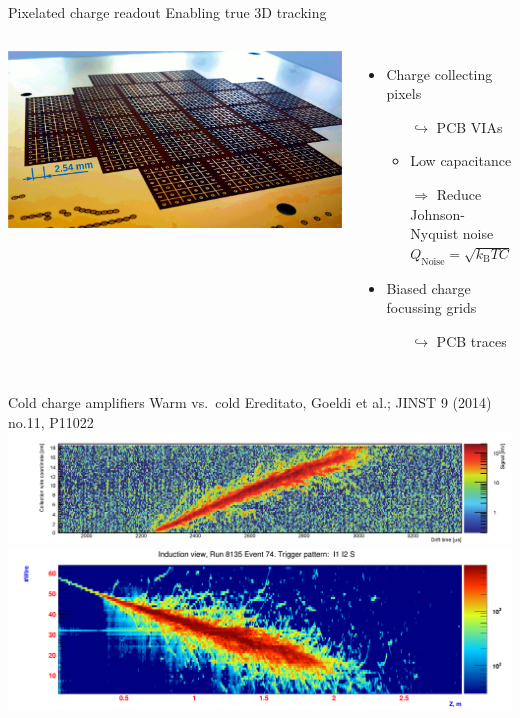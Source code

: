 \documentclass[]{beamer}
\newcommand*{\m}{\mathrm}
\newcommand*{\emphcoltitle}{blue}
\begin{document}
\begin{frame}{Pixelated charge readout}{\color{\emphcoltitle} Enabling true 3D tracking}
	\begin{columns}[c]
		\centering
		\includegraphics[width=\textwidth]{viper/pixies}
		\begin{itemize}
			\item Charge collecting pixels
			\begin{itemize}
				\item[$\hookrightarrow$] PCB VIAs
				\item Low capacitance
				\item[$\Rightarrow$] Reduce Johnson-Nyquist noise $Q_{\m{Noise}} = \sqrt{k_{\m{B}}TC}$
			\end{itemize}
			\item Biased charge focussing grids
			\begin{itemize}
				\item[$\hookrightarrow$] PCB traces
			\end{itemize}
		\end{itemize}
	\end{columns}
\end{frame}

\begin{frame}{Cold charge amplifiers}{\color{\emphcoltitle} Warm vs.\ cold}
	{\tiny Ereditato, Goeldi et al.; JINST 9 (2014) no.11, P11022~\cite{AT_larasic}}\\
	\centering
	\includegraphics[width=\textwidth]{defence/AT_warmPreamps}\\
	\includegraphics[width=\textwidth]{defence/AT_coldPreamps}
\end{frame}
\end{document}
